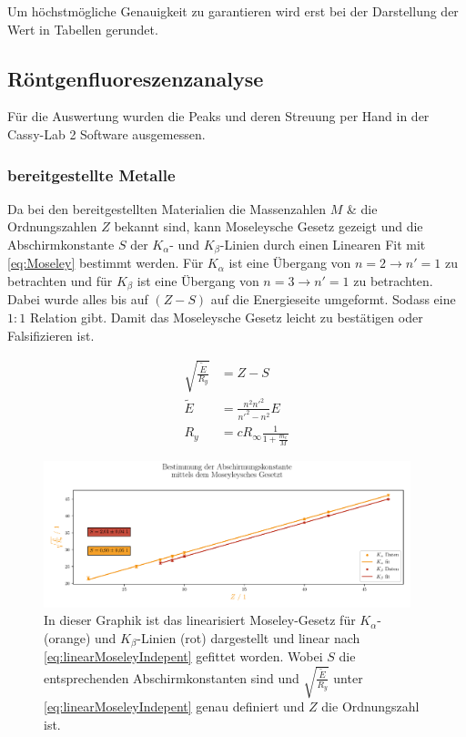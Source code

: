 \documentclass[12pt,english,ngerman]{scrartcl}
\begin{document}
Um höchstmögliche Genauigkeit zu garantieren wird erst bei der Darstellung der
Wert in Tabellen gerundet.

\subsection{Röntgenfluoreszenzanalyse}
Für die Auswertung wurden die Peaks und deren Streuung per Hand in der
Cassy-Lab 2 Software ausgemessen.

\subsubsection{bereitgestellte Metalle}

Da bei den bereitgestellten Materialien die Massenzahlen $M$ \& die
Ordnungszahlen $Z$ bekannt sind, kann Moseleysche Gesetz gezeigt und die
Abschirmkonstante $S$ der $K_\alpha$- und $K_\beta$-Linien durch einen Linearen
Fit mit \autoref{eq:Moseley} bestimmt werden. Für $K_\alpha$ ist eine Übergang
von $n=2 \rightarrow n'=1$ zu betrachten und für $K_\beta$ ist eine Übergang
von $n=3 \rightarrow n'=1$ zu betrachten. Dabei wurde alles bis auf $(Z-S)$ auf
die Energieseite umgeformt. Sodass eine $1:1$ Relation gibt. Damit das
Moseleysche Gesetz leicht zu bestätigen oder Falsifizieren ist.

\begin{align}
	\sqrt{\frac{\tilde{E}}{R_y}} & = Z-S\label{eq:linearMoseleyIndepent} \\
	\tilde{E}                    & = \frac{n^2n'^2}{n'^2-n^2}E           \\
	R_y                          & = cR_\infty \frac{1}{1+\frac{m_e}{M}}
\end{align}

\begin{figure}[H]
	\begin{center}
		\includegraphics[width=0.95\textwidth]{figures/moseley.pdf}
	\end{center}
	\caption[Abschirmkonstanten K-alpha- und K-beta-Linien]{In dieser Graphik ist das
		linearisiert Moseley-Gesetz für $K_\alpha$- (orange) und $K_\beta$-Linien (rot)
		dargestellt und linear nach \autoref{eq:linearMoseleyIndepent} gefittet worden.
		Wobei $S$ die entsprechenden Abschirmkonstanten sind und
		$\sqrt{\frac{\tilde{E}}{R_y}}$ unter \autoref{eq:linearMoseleyIndepent} genau
		definiert und $Z$ die Ordnungszahl ist.
	}\label{fig:moseley}
\end{figure}
\end{document}
